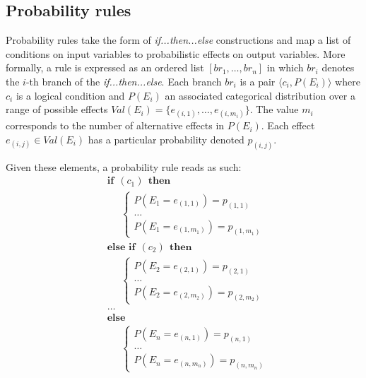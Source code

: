 \subsection{Probability rules}
\label{sec:probabirules}

Probability rules take the form of \textit{if...then...else} constructions and map a list of conditions on input variables to probabilistic effects on output variables. More formally, a rule is expressed as an ordered list $[ br_1, \dots, br_{n}]$ in which $br_i$ denotes the $i$-th branch of the \textit{if...then...else}. Each branch $br_i$ is a pair $\langle c_i, P(E_i) \rangle$ where $c_i$ is a logical condition and $P(E_i)$ an associated categorical distribution over a range of possible effects $\mathit{Val}(E_i) = \{e_{(i,1)}, \dots, e_{(i,m_i)}\}$.  The value $m_i$ corresponds to the number of alternative effects in $P(E_i)$.  Each effect $e_{(i,j)} \in \mathit{Val}(E_i)$ has a particular probability denoted $p_{(i,j)}$. 

Given these elements, a probability rule reads as such:
\begin{equation}
\begin{aligned}
& \textbf{if} \ \ (c_{1}) \ \ \textbf{then} \\ 
& \;\;\;\;\; \begin{cases}
P(E_1\!=\!e_{(1,1)}) = p_{(1,1)} \\
 \dots \\
P(E_1\!=\!e_{(1,m_1)}) = p_{(1,m_1)} 
\end{cases} \\[3mm]
& \textbf{else if} \ \ (c_{2}) \ \ \textbf{then} \\ 
& \;\;\;\;\; \begin{cases}
P(E_2\!=\!e_{(2,1)}) = p_{(2,1)} \\
 \dots \\
P(E_2\!=\!e_{(2,m_2)}) = p_{(2,m_2)}
\end{cases} \\ 
& \dots  \\
& \textbf{else} \\
& \;\;\;\;\; \begin{cases}
P(E_{n}\!=\!e_{(n,1)}) = p_{(n,1)} \\
\dots \\
P(E_{n}\!=\!e_{(n,m_n)}) = p_{(n,m_n)}
\end{cases}
\end{aligned}
\label{eq:probrule}
\end{equation}

